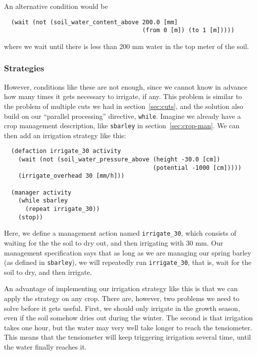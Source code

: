 \documentclass[a4paper,11pt]{article}
\begin{document}
An alternative condition would be
\begin{verbatim}
  (wait (not (soil_water_content_above 200.0 [mm] 
                                       (from 0 [m]) (to 1 [m]))))
\end{verbatim}
where we wait until there is less than 200 mm water in the top meter
of the soil. 


\subsubsection{Strategies}

However, conditions like these are not enough, since we cannot know in
advance how many times it gets necessary to irrigate, if any.  This
problem is similar to the problem of multiple cuts we had in
section~\ref{sec:cuts}, and the solution also build on our ``parallel
processing'' directive, \texttt{while}.  Imagine we already have a
crop management description, like \texttt{sbarley} in
section~\ref{sec:crop-man}.  We can then add an irrigation strategy
like this:
\begin{verbatim}
  (defaction irrigate_30 activity 
    (wait (not (soil_water_pressure_above (height -30.0 [cm])
                                          (potential -1000 [cm]))))
    (irrigate_overhead 30 [mm/h]))

  (manager activity
    (while sbarley
      (repeat irrigate_30))
    (stop))
\end{verbatim}

Here, we define a management action named \texttt{irrigate\_30}, which
consists of waiting for the the soil to dry out, and then irrigating
with 30 mm.  Our management specification says that as long as we are
managing our spring barley (as defined in \texttt{sbarley}), we will
repeatedly run \texttt{irrigate\_30}, that is, wait for the soil to
dry, and then irrigate.

An advantage of implementing our irrigation strategy like this is
that we can apply the strategy on any crop.  There are, however, two
problems we need to solve before it gets useful.  First, we should only
irrigate in the growth season, even if the soil somehow dries out
during the winter.  The second is that irrigation takes one hour, but
the water may very well take longer to reach the tensiometer.  This
means that the tensiometer will keep triggering irrigation several
time, until the water finally reaches it.
\end{document}
